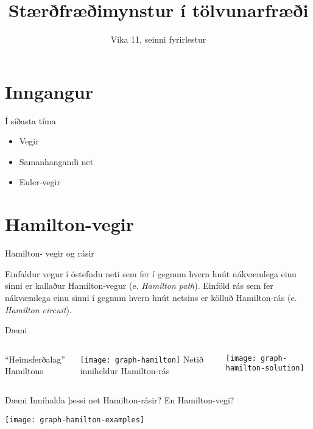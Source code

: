 \documentclass[handout]{beamer}
\title{Stærðfræðimynstur í tölvunarfræði}
\subtitle{Vika 11, seinni fyrirlestur}
\begin{document}
\begin{frame}
\titlepage
\end{frame}


\section{Inngangur}

\begin{frame}{Í síðasta tíma}
\begin{itemize}
 \item Vegir 
 \item Samanhangandi net
 \item Euler-vegir
\end{itemize}
\end{frame}

\section{Hamilton-vegir}

\begin{frame}{Hamilton- vegir og rásir}
\begin{tcolorbox}[title=Hamilton-vegir og rásir]
Einfaldur vegur í óstefndu neti sem fer í gegnum hvern hnút nákvæmlega einu sinni er kallaður Hamilton-vegur (e. \emph{Hamilton path}). Einföld rás sem fer nákvæmlega einu sinni í gegnum hvern hnút netsins er kölluð Hamilton-rás (e. \emph{Hamilton circuit}).
\end{tcolorbox}
\end{frame}

\begin{frame}{Dæmi}
\begin{columns}
``Heimsferðalag'' Hamiltons

\texttt{[image: graph-hamilton]}
\pause
{}
Netið inniheldur Hamilton-rás

\texttt{[image: graph-hamilton-solution]}
\end{columns}
\end{frame}

\begin{frame}{Dæmi}
Innihalda þessi net Hamilton-rásir? En Hamilton-vegi?
\begin{center}
\texttt{[image: graph-hamilton-examples]}
\end{center}

\end{frame}
\end{document}
